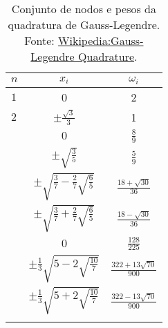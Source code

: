 \begin{table}[H]
  \centering
  \caption{Conjunto de nodos e pesos da quadratura de Gauss-Legendre. Fonte: \href{https://en.wikipedia.org/wiki/Gauss\%E2\%80\%93Legendre\_quadrature}{Wikipedia:Gauss-Legendre Quadrature}.}
  \begin{tabular}{lcc}
    $n$ & $x_i$ & $\omega_i$ \\\hline\noalign{\smallskip}
    $1$ & 0 & 2 \\\noalign{\smallskip}\hline
    $2$ & $\displaystyle \pm \frac{\sqrt{3}}{3}$ & 1\\\noalign{\smallskip}\hline\noalign{\smallskip}
    \multirow{2}{*}{$3$} & $0$ & $\displaystyle \frac{8}{9}$ \\
      & $\displaystyle \pm\sqrt{\frac{3}{5}}$ & $\displaystyle \frac{5}{9}$\\\noalign{\smallskip}\hline\noalign{\smallskip}
    \multirow{2}{*}{$4$} & $\displaystyle \pm\sqrt{\frac{3}{7}-\frac{2}{7}\sqrt{\frac{6}{5}}}$ & $\displaystyle \frac{18+\sqrt{30}}{36}$ \\\noalign{\smallskip}
 & $\displaystyle \pm\sqrt{\frac{3}{7}+\frac{2}{7}\sqrt{\frac{6}{5}}}$ & $\displaystyle \frac{18-\sqrt{30}}{36}$\\\noalign{\smallskip}\hline\noalign{\smallskip}
    \multirow{3}{*}{$5$} & $0$ & $\displaystyle \frac{128}{225}$ \\\noalign{\smallskip}
        & $\displaystyle \pm\frac{1}{3}\sqrt{5-2\sqrt{\frac{10}{7}}}$ & $\displaystyle \frac{322+13\sqrt{70}}{900}$ \\\noalign{\smallskip}
        & $\displaystyle \pm\frac{1}{3}\sqrt{5+2\sqrt{\frac{10}{7}}}$ & $\displaystyle \frac{322-13\sqrt{70}}{900}$ \\\noalign{\smallskip}\hline
  \end{tabular}
  \label{tab:Gauss-Legendre}
\end{table}


